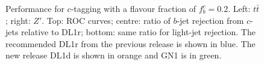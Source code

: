 \begin{figure}[h!]
{  }
  \caption{Performance for $c$-tagging with a flavour fraction of $f^c_b = 0.2$. Left: $t\bar{t}$; right: $Z'$. Top: ROC curves; centre: ratio of $b$-jet rejection from $c$-jets relative to DL1r; bottom: same ratio for light-jet rejection. The recommended DL1r from the previous release is shown in blue. The new release DL1d is shown in orange and GN1 is in green.}
  \label{fig:DL1dz}
\end{figure}
\vspace*{\fill}

\clearpage



